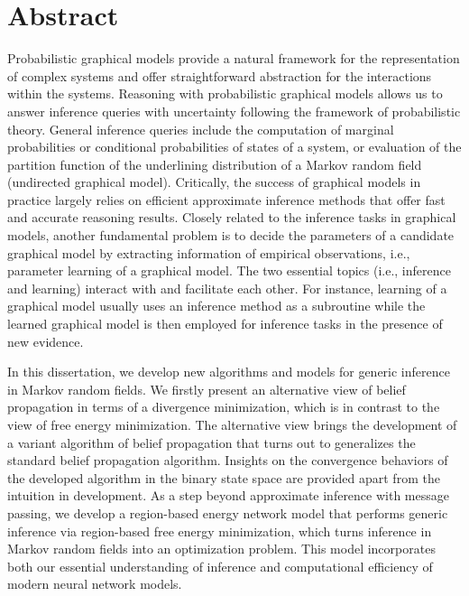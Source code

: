 \chapter{Abstract}
Probabilistic graphical models provide a natural framework for the representation of complex systems and offer straightforward abstraction for the interactions within the systems. Reasoning with probabilistic graphical models allows us to answer inference queries with uncertainty following the framework of probabilistic theory. General inference queries include the computation of marginal probabilities or conditional probabilities of states of a system, or evaluation of the partition function of the underlining distribution of a Markov random field (undirected graphical model). Critically, the success of graphical models in practice largely relies on efficient approximate inference methods that offer fast and accurate reasoning results. Closely related to the inference tasks in graphical models, another fundamental problem is to decide the parameters of a candidate graphical model by extracting information of empirical observations, i.e., parameter learning of a graphical model. The two essential topics (i.e., inference and learning) interact with and facilitate each other. For instance, learning of a graphical model usually uses an inference method as a subroutine while the learned graphical model is then employed for inference tasks in the presence of new evidence.

In this dissertation, we develop new algorithms and models for generic inference in Markov random fields. We firstly present an alternative view of belief propagation in terms of a divergence minimization, which is in contrast to the view of free energy minimization. The alternative view brings the development of a variant algorithm of belief propagation that turns out to generalizes the standard belief propagation algorithm. Insights on the convergence behaviors of the developed algorithm in the binary state space are provided apart from the intuition in development. As a step beyond approximate inference with message passing, we develop a region-based energy network model that performs generic inference via region-based free energy minimization, which turns inference in Markov random fields into an optimization problem. This model incorporates both our essential understanding of inference and computational efficiency of modern neural network models.

